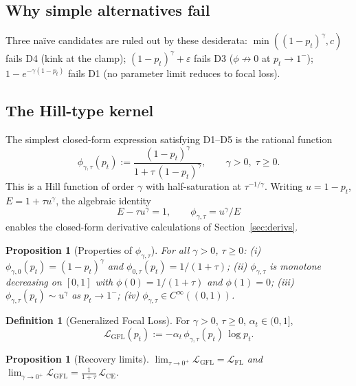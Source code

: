 \documentclass[conference]{IEEEtran}
\newtheorem{proposition}[theorem]{Proposition}
\theoremstyle{definition}
\newtheorem{definition}[theorem]{Definition}
\newcommand{\LCE}{\mathcal{L}_{\mathrm{CE}}}
\newcommand{\LFL}{\mathcal{L}_{\mathrm{FL}}}
\newcommand{\LGFL}{\mathcal{L}_{\mathrm{GFL}}}
\begin{document}
\subsection{Why simple alternatives fail}
Three na\"ive candidates are ruled out by these desiderata: $\min((1{-}p_t)^\gamma, c)$ fails D4 (kink at the clamp); $(1{-}p_t)^\gamma + \varepsilon$ fails D3 ($\phi \not\to 0$ at $p_t \to 1^-$); $1 - e^{-\gamma(1-p_t)}$ fails D1 (no parameter limit reduces to focal loss).

\subsection{The Hill-type kernel}
The simplest closed-form expression satisfying D1--D5 is the rational function
\begin{equation}
\boxed{\;
\phi_{\gamma,\tau}(p_t) := \frac{(1-p_t)^\gamma}{1 + \tau\,(1-p_t)^\gamma}, \qquad \gamma > 0, \;\tau \ge 0.
\;}
\label{eq:hill}
\end{equation}
This is a Hill function of order $\gamma$ with half-saturation at $\tau^{-1/\gamma}$. Writing $u = 1-p_t$, $E = 1 + \tau u^\gamma$, the algebraic identity
\begin{equation}
E - \tau u^\gamma = 1, \qquad \phi_{\gamma,\tau} = u^\gamma / E
\label{eq:identity}
\end{equation}
enables the closed-form derivative calculations of Section~\ref{sec:derivs}.

\begin{proposition}[Properties of $\phi_{\gamma,\tau}$]\label{prop:phi-props}
For all $\gamma > 0$, $\tau \ge 0$:
(i) $\phi_{\gamma,0}(p_t) = (1-p_t)^\gamma$ and $\phi_{0,\tau}(p_t) = 1/(1+\tau)$;
(ii) $\phi_{\gamma,\tau}$ is monotone decreasing on $[0,1]$ with $\phi(0) = 1/(1+\tau)$ and $\phi(1) = 0$;
(iii) $\phi_{\gamma,\tau}(p_t) \sim u^\gamma$ as $p_t \to 1^-$;
(iv) $\phi_{\gamma,\tau} \in C^\infty((0,1))$.
\end{proposition}

\begin{definition}[Generalized Focal Loss]\label{def:gfl}
For $\gamma > 0$, $\tau \ge 0$, $\alpha_t \in (0,1]$,
\begin{equation}
\boxed{\;
\LGFL(p_t) := -\alpha_t\,\phi_{\gamma,\tau}(p_t)\,\log p_t.
\;}
\label{eq:gfl}
\end{equation}
\end{definition}

\begin{proposition}[Recovery limits]\label{prop:gfl-limits}
\(\lim_{\tau \to 0^+} \LGFL = \LFL\) and \(\lim_{\gamma \to 0^+} \LGFL = \tfrac{1}{1+\tau}\,\LCE\).
\end{proposition}
\end{document}
